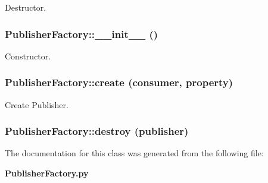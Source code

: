Destructor. 

\subsubsection{\setlength{\rightskip}{0pt plus 5cm}Publisher\-Factory::\_\-\_\-init\_\-\_\- ()}\label{classPublisherFactory_PublisherFactorya0}


Constructor. 

\subsubsection{\setlength{\rightskip}{0pt plus 5cm}Publisher\-Factory::create (consumer, property)}\label{classPublisherFactory_PublisherFactorya2}


Create Publisher. 

\subsubsection{\setlength{\rightskip}{0pt plus 5cm}Publisher\-Factory::destroy (publisher)}\label{classPublisherFactory_PublisherFactorya3}




The documentation for this class was generated from the following file:\begin{CompactItemize}
\item 
{\bf Publisher\-Factory.py}\end{CompactItemize}
